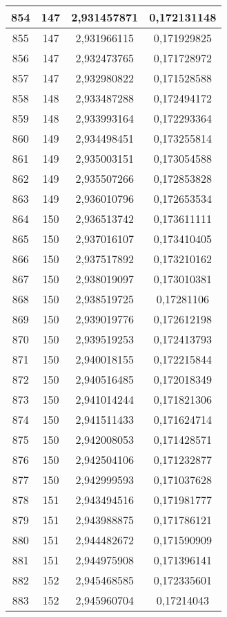 {\begin{minipage}[!h]{0.45\textwidth}
\begin{longtable}{cccc}
854 & 147 & 2,931457871 & 0,172131148 \\ \hline
855 & 147 & 2,931966115 & 0,171929825 \\ \hline
856 & 147 & 2,932473765 & 0,171728972 \\ \hline
857 & 147 & 2,932980822 & 0,171528588 \\ \hline
858 & 148 & 2,933487288 & 0,172494172 \\ \hline
859 & 148 & 2,933993164 & 0,172293364 \\ \hline
860 & 149 & 2,934498451 & 0,173255814 \\ \hline
861 & 149 & 2,935003151 & 0,173054588 \\ \hline
862 & 149 & 2,935507266 & 0,172853828 \\ \hline
863 & 149 & 2,936010796 & 0,172653534 \\ \hline
864 & 150 & 2,936513742 & 0,173611111 \\ \hline
865 & 150 & 2,937016107 & 0,173410405 \\ \hline
866 & 150 & 2,937517892 & 0,173210162 \\ \hline
867 & 150 & 2,938019097 & 0,173010381 \\ \hline
868 & 150 & 2,938519725 & 0,17281106 \\ \hline
869 & 150 & 2,939019776 & 0,172612198 \\ \hline
870 & 150 & 2,939519253 & 0,172413793 \\ \hline
871 & 150 & 2,940018155 & 0,172215844 \\ \hline
872 & 150 & 2,940516485 & 0,172018349 \\ \hline
873 & 150 & 2,941014244 & 0,171821306 \\ \hline
874 & 150 & 2,941511433 & 0,171624714 \\ \hline
875 & 150 & 2,942008053 & 0,171428571 \\ \hline
876 & 150 & 2,942504106 & 0,171232877 \\ \hline
877 & 150 & 2,942999593 & 0,171037628 \\ \hline
878 & 151 & 2,943494516 & 0,171981777 \\ \hline
879 & 151 & 2,943988875 & 0,171786121 \\ \hline
880 & 151 & 2,944482672 & 0,171590909 \\ \hline
881 & 151 & 2,944975908 & 0,171396141 \\ \hline
882 & 152 & 2,945468585 & 0,172335601 \\ \hline
883 & 152 & 2,945960704 & 0,17214043 \\ \hline

\end{longtable}
\end{minipage}}
